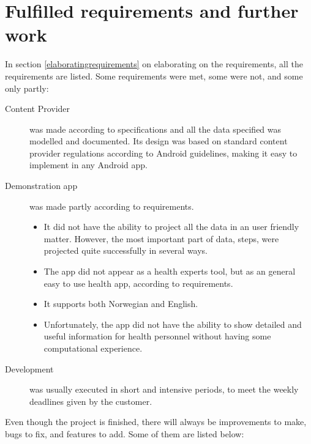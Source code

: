 \section{Fulfilled requirements and further work}
In section \ref{elaboratingrequirements} on elaborating on the requirements, all the requirements are listed. Some requirements were met, some were not, and some only partly:
\begin{description}
\item[Content Provider] was made according to specifications and all the data specified was modelled and documented. Its design was based on standard content provider regulations according to Android guidelines, making it easy to implement in any Android app.
\item[Demonstration app] was made partly according to requirements.
\begin{itemize}
\item It did not have the ability to project all the data in an user friendly matter. However, the most important part of data, steps, were projected quite successfully in several ways.
\item The app did not appear as a health experts tool, but as an general easy to use health app, according to requirements.
\item It supports both Norwegian and English.
\item Unfortunately, the app did not have the ability to show detailed and useful information for health personnel without having some computational experience.
\end{itemize} 
\item[Development] was usually executed in short and intensive periods, to meet the weekly deadlines given by the customer.
\end{description}
Even though the project is finished, there will always be improvements to make, bugs to fix, and features to add. Some of them are listed below:
